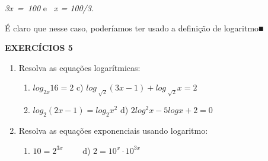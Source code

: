 \documentclass[12pt]{article}
\begin{document}
\begin{enumerate}[label*={\fontsize{14pt}{14pt}\selectfont \textbf{\arabic*.}}]
\begin{adjustwidth}{0.3in}{0.0in}
\end{adjustwidth}

\begin{adjustwidth}{0.3in}{0.0in}
\begin{justify}
\textit{3x\ =\ 100   }e \textit{\  x = 100/3.}
\end{justify}\par

\end{adjustwidth}

\begin{adjustwidth}{0.3in}{0.0in}
\begin{justify}
É claro que nesse caso, poderíamos ter usado a definição de logaritmo■
\end{justify}\par

\end{adjustwidth}


\vspace{\baselineskip}
\begin{justify}
{\fontsize{14pt}{16.8pt}\selectfont \textbf{EXERCÍCIOS 5}\par}
\end{justify}\par

\begin{enumerate}
	\item Resolva as equações logarítmicas:\par

\begin{enumerate}
	\item  \( log_{2x}16=2 \)  \tab \tab \tab c)  \( log_{\sqrt[]{2}} \left( 3x-1 \right) +log_{\sqrt[]{2}} x=2 \) \par

	\item  \( log_{2} \left( 2x-1 \right) =log_{2} x^{2} \) \tab \tab d)  \( 2 log^{2}x-5logx+2=0  \) 
\end{enumerate}\par


\vspace{\baselineskip}
	\item Resolva as equações exponenciais usando logaritmo:\par

\begin{enumerate}
	\item  \( 10=2^{3x} \) \tab \ \ \ \  \tab \tab  d)  \( 2=10^{x} \cdot  10^{3x} \)    
\end{enumerate}\par


\end{enumerate}
\end{enumerate}
\end{document}
